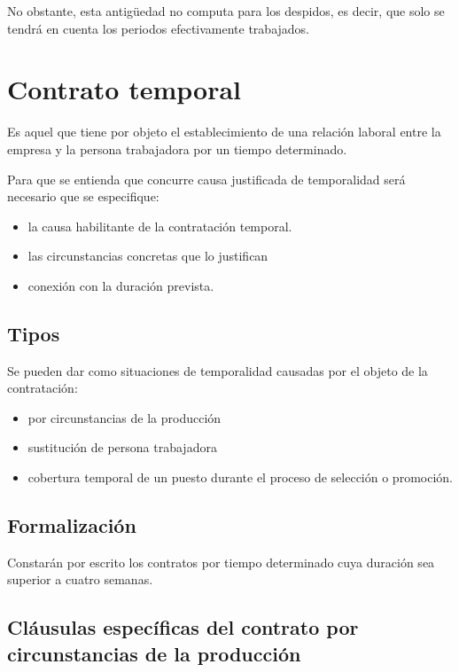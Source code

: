 \documentclass{article}
\begin{document}
	No obstante, esta antigüedad no computa para los despidos, es decir, que solo se tendrá en cuenta los periodos efectivamente trabajados.
	
	\section*{Contrato temporal}
	
	Es aquel que tiene por objeto el establecimiento de una relación laboral entre la empresa y la persona trabajadora por un tiempo determinado.
	
	Para que se entienda que concurre causa justificada de temporalidad será necesario que se especifique:
	
	\begin{itemize}
		\item la causa habilitante de la contratación temporal.
		\item las circunstancias concretas que lo justifican
		\item conexión con la duración prevista.
	\end{itemize}
	
	\subsection*{Tipos}
	
	Se pueden dar como situaciones de temporalidad causadas por el objeto de la contratación:
	
	\begin{itemize}
		\item por circunstancias de la producción
		\item sustitución de persona trabajadora
		\item cobertura temporal de un puesto durante el proceso de selección o promoción.
	\end{itemize}
	
	\subsection*{Formalización}
	
	Constarán por escrito los contratos por tiempo determinado cuya duración sea superior a cuatro semanas.
	
	\subsection*{Cláusulas específicas del contrato por circunstancias de la producción}
	
\end{document}
